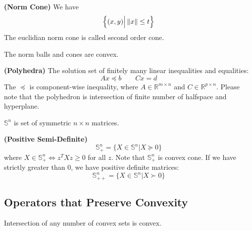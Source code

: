 \begin{definition}{\textbf{(Norm Cone)}}
    We have
    \begin{equation*}
        \Big\{ (x, y) \Big| \left\lVert x\right\rVert\le t \Big\}
    \end{equation*}
    The euclidian norm cone is called second order cone. 
\end{definition}

\begin{lemma}
    The norm balls and cones are convex.
\end{lemma}

\begin{definition}{\textbf{(Polyhedra)}}
    The solution set of finitely many linear inequalities and equalities:
    \begin{equation*}
        Ax\preceq b \qquad Cx = d
    \end{equation*}
    The $\preceq$ is component-wise inequality, where $A\in \mathbb{R}^{m\times n}$ and $C\in \mathbb{R}^{p\times n}$. Please note that the polyhedron is intersection of finite number of halfspace and hyperplane.
\end{definition}

\begin{definition}
    $\mathbb{S}^n$ is set of symmetric $n\times n$ matrices. 
\end{definition}

\begin{definition}{\textbf{(Positive Semi-Definite)}}
    \begin{equation*}
        \mathbb{S}^n_+ = \Big\{ X \in \mathbb{S}^n \Big| X\succeq0 \Big\}
    \end{equation*}
    where $X \in \mathbb{S}^n_+ \iff z^TXz\ge0$ for all $z$. Note that $\mathbb{S}^n_+$ is convex cone. If we have strictly greater than $0$, we have positive definite matrices:
    \begin{equation*}
        \mathbb{S}^n_{++} = \Big\{ X \in \mathbb{S}^n \Big| X\succ0 \Big\}
    \end{equation*}
\end{definition}

\subsection{Operators that Preserve Convexity}

\begin{proposition}
    Intersection of any number of convex sets is convex.     
\end{proposition}

